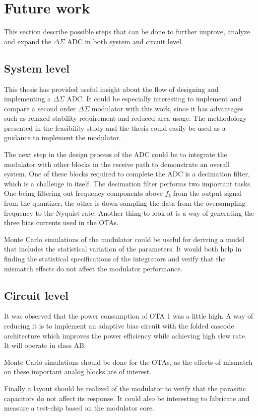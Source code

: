 \section{Future work}
This section describe possible steps that can be done to further improve, analyze and expand the $\Delta\Sigma$ ADC in both system and circuit level. 

\subsection{System level}
This thesis has provided useful insight about the flow of designing and implementing a $\Delta\Sigma$ ADC. It could be especially interesting to implement and compare a second order $\Delta\Sigma$ modulator with this work, since it has advantages such as relaxed stability requirement and reduced area usage. The methodology presented in the feasibility study and the thesis could easily be used as a guidance to implement the modulator. 

The next step in the design process of the ADC could be to integrate the modulator with other blocks in the receive path to demonstrate an overall system. One of these blocks required to complete the ADC is a decimation filter, which is a challenge in itself. The decimation filter performs two important tasks. One being filtering out frequency components above $f_b$ from the output signal from the quantizer, the other is down-sampling the data from the oversampling frequency to the Nyquist rate. Another thing to look at is a way of generating the three bias currents used in the OTAs. 

Monte Carlo simulations of the modulator could be useful for deriving a model that includes the statistical variation of the parameters. It would both help in finding the statistical specifications of the integrators and verify that the mismatch effects do not affect the modulator performance. 

\subsection{Circuit level}

It was observed that the power consumption of OTA 1 was a little high. A way of reducing it is to implement an adaptive bias circuit with the folded cascode architecture which improves the power efficiency while achieving high slew rate. It will operate in class AB. 

Monte Carlo simulations should be done for the OTAs, as the effects of mismatch on these important analog blocks are of interest.

Finally a layout should be realized of the modulator to verify that the parasitic capacitors do not affect its response. It could also be interesting to fabricate and measure a test-chip based on the modulator core.
